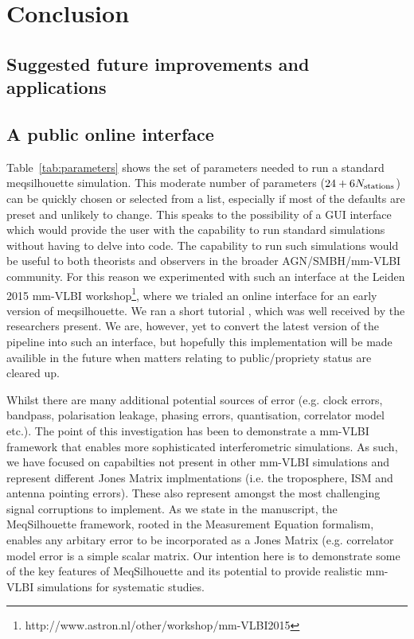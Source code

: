\chapter{Conclusion}

\section{Suggested future improvements and applications}


\section{A public online interface}

Table~\ref{tab:parameters} shows the set of parameters needed to run a standard {\sc meqsilhouette} simulation. This moderate number of parameters ($24+6N_{\rm stations}$) can be quickly chosen or selected from a list, especially if most of the defaults are preset and unlikely to change. This speaks to the possibility of a GUI interface which would provide the user with the capability to run standard simulations without having to delve into code. The capability to run such simulations would be useful to both theorists and observers in the broader AGN/SMBH/mm-VLBI community. For this reason we experimented with such an interface at the Leiden 2015 mm-VLBI workshop\footnote{http://www.astron.nl/other/workshop/mm-VLBI2015}, where we trialed an online interface for an early version of {\sc meqsilhouette}. We ran a short tutorial , which was well received by the researchers present. We are, however, yet to convert the latest version of the pipeline \citep{Blecher_2016} into such an interface, but hopefully this implementation will be made availible in the future when matters relating to public/propriety status are cleared up.

Whilst there are many additional potential sources of error (e.g. clock errors, bandpass, polarisation leakage, phasing errors, quantisation, correlator model etc.). The point of this investigation has been to demonstrate a mm-VLBI framework that enables more sophisticated interferometric simulations. As such, we have focused on capabilties not present in other mm-VLBI simulations and represent different Jones Matrix implmentations (i.e. the troposphere, ISM and antenna pointing errors). These also represent amongst the most challenging signal corruptions to implement. As we state in the manuscript, the MeqSilhouette framework, rooted in the Measurement Equation formalism, enables any arbitary error to be incorporated as a Jones Matrix (e.g. correlator model error is a simple scalar matrix. Our intention here is to demonstrate some of the key features of MeqSilhouette and its potential to provide realistic mm-VLBI simulations for systematic studies.

